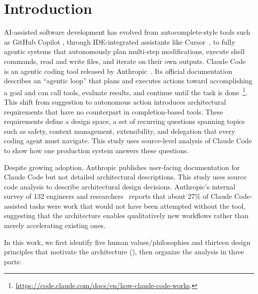 \section{Introduction}
\label{sec:intro}

AI-assisted software development has evolved from autocomplete-style tools such as GitHub Copilot \citep{chen2021evaluating}, through IDE-integrated assistants like Cursor~\citep{cursor2026official}, to fully agentic systems that autonomously plan multi-step modifications, execute shell commands, read and write files, and iterate on their own outputs. Claude Code~\citep{anthropic2026claudecode} is an agentic coding tool released by Anthropic~\citep{anthropic2026github}. Its official documentation describes an ``agentic loop'' that plans and executes actions toward accomplishing a goal and can call tools, evaluate results, and continue until the task is done~\footnote{\url{https://code.claude.com/docs/en/how-claude-code-works}.}. This shift from suggestion to autonomous action introduces architectural requirements that have no counterpart in completion-based tools. These requirements define a design space, a set of recurring questions spanning topics such as safety, context management, extensibility, and delegation that every coding agent must navigate. This study uses source-level analysis of Claude Code to show how one production system answers these questions.

Despite growing adoption, Anthropic publishes user-facing documentation for Claude Code but not detailed architectural descriptions. This study uses source code analysis to describe architectural design decisions. Anthropic's internal survey of 132 engineers and researchers~\citep{anthropic2025internal} reports that about 27\% of Claude Code-assisted tasks were work that would not have been attempted without the tool, suggesting that the architecture enables qualitatively new workflows rather than merely accelerating existing ones.


In this work, we first identify five human values/philosophies and thirteen design principles that motivate the architecture (), then organize the analysis in three parts:

